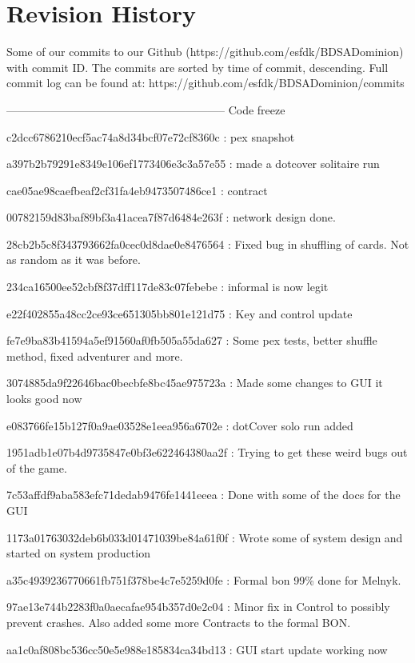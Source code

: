 \section{Revision History}
Some of our commits to our Github (https://github.com/esfdk/BDSADominion)  with commit ID. The commits are sorted by time of commit, descending. Full commit log can be found at: https://github.com/esfdk/BDSADominion/commits



----------------------------------------------------------- Code freeze 



c2dcc6786210ecf5ac74a8d34bcf07e72cf8360c : pex snapshot

a397b2b79291e8349e106ef1773406e3c3a57e55 : made a dotcover solitaire run

cae05ae98caefbeaf2cf31fa4eb9473507486ce1 : contract

00782159d83baf89bf3a41acea7f87d6484e263f : network design done.

28cb2b5c8f343793662fa0cec0d8dae0e8476564 : Fixed bug in shuffling of cards. Not as random as it was before.

234ca16500ee52cbf8f37dff117de83c07febebe : informal is now legit

e22f402855a48cc2ce93ce651305bb801e121d75 : Key and control update

fe7e9ba83b41594a5ef91560af0fb505a55da627 : Some pex tests, better shuffle method, fixed adventurer and more.

3074885da9f22646bac0becbfe8bc45ae975723a : Made some changes to GUI it looks good now

e083766fe15b127f0a9ae03528e1eea956a6702e : dotCover solo run added

1951adb1e07b4d9735847e0bf3e622464380aa2f : Trying to get these weird bugs out of the game.

7c53affdf9aba583efc71dedab9476fe1441eeea : Done with some of the docs for the GUI

1173a01763032deb6b033d01471039be84a61f0f : Wrote some of system design and started on system production

a35c4939236770661fb751f378be4c7e5259d0fe : Formal bon 99\% done for Melnyk.

97ae13e744b2283f0a0aecafae954b357d0e2c04 : Minor fix in Control to possibly prevent crashes. Also added some more Contracts to the formal BON.

aa1c0af808bc536cc50e5e988e185834ca34bd13 : GUI start update working now

